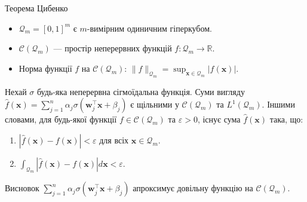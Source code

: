 \documentclass{zkdl-presentation-template}
\begin{document}
    \begin{frame}{Теорема Цибенко}
        \begin{itemize}
            \item $\mathcal{Q}_m = [0,1]^m$ є $m$-вимірним одиничним гіперкубом.\pause
            \item $\mathcal{C}(\mathcal{Q}_m)$ --- простір неперервних функцій $f: \mathcal{Q}_m \to \mathbb{R}$.\pause
            \item Норма функції $f$ на $\mathcal{C}(\mathcal{Q}_m)$: $\|f\|_{\mathcal{Q}_m} = \sup_{\boldsymbol{x} \in \mathcal{Q}_m} |f(\boldsymbol{x})|$.\pause
        \end{itemize}

        \begin{theorem}[Цибенко]
            Нехай $\sigma$ будь-яка неперервна сігмоїдальна функція. Суми вигляду
            $\hat{f}(\boldsymbol{x}) = \sum_{j=1}^n
            \alpha_j\sigma(\boldsymbol{w}_j^{\top}\boldsymbol{x} + \beta_j)$ є щільними у
            $\mathcal{C}(\mathcal{Q}_m)$ та $L^1(\mathcal{Q}_m)$. Іншими словами, для
            будь-якої функції $f \in \mathcal{C}(\mathcal{Q}_m)$ та $\varepsilon > 0$,
            існує сума $\hat{f}(\boldsymbol{x})$ така, що:
            \begin{enumerate}
                \item $|\hat{f}(\boldsymbol{x})-f(\boldsymbol{x})|<\varepsilon$ для всіх $\boldsymbol{x} \in
                \mathcal{Q}_m$.
                \item $\int_{\mathcal{Q}_m}|\hat{f}(\boldsymbol{x})-f(\boldsymbol{x})|d\boldsymbol{x} <
                \varepsilon$.
            \end{enumerate}
        \end{theorem}

        \pause\begin{alertblock}{Висновок}
            $\sum_{j=1}^n
            \alpha_j\sigma(\boldsymbol{w}_j^{\top}\boldsymbol{x} + \beta_j)$ апроксимує 
            довільну функцію на $\mathcal{C}(\mathcal{Q}_m)$.
        \end{alertblock}
    \end{frame}
\end{document}
